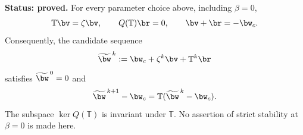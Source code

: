\begin{lemma}
\label{lem:q3-large-decomposition}
\textbf{Status: proved.}
For every parameter choice above, including \(\beta=0\),
\begin{equation}
\mathbb{T}\bv=\zeta\bv,
\qquad Q(\mathbb{T})\br=0,
\qquad \bv+\br=-\bw_c.
\label{eq:q3-large-decomposition-identities}
\end{equation}
Consequently, the candidate sequence
\begin{equation}
\widetilde{\bw}^{\,k}:=
\bw_c+\zeta^k\bv+\mathbb{T}^k\br
\label{eq:q3-large-candidate}
\end{equation}
satisfies \(\widetilde{\bw}^{\,0}=0\) and
\[
\widetilde{\bw}^{\,k+1}-\bw_c
=\mathbb{T}(\widetilde{\bw}^{\,k}-\bw_c).
\]
The subspace \(\ker Q(\mathbb{T})\) is invariant under \(\mathbb{T}\).
No assertion of strict stability at \(\beta=0\) is made here.
\end{lemma}

